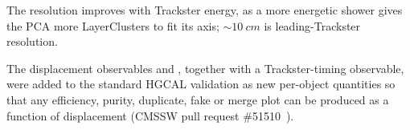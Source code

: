 The resolution improves with Trackster energy, as a more energetic shower gives
the PCA more LayerClusters to fit its axis; $\sim\SI{10}{cm}$ is
leading-Trackster resolution.

The displacement observables \R{} and \alphainc{}, together with a
Trackster-timing observable, were added to the standard HGCAL validation as new
per-object quantities so that any efficiency, purity, duplicate, fake or merge plot
can be produced as a function of displacement (CMSSW pull request
\#51510~\cite{DoljaninPR51510}).
